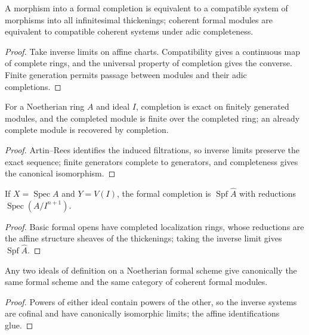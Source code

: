 \begin{proposition}
\label{prop:II-9-2}
A morphism into a formal completion is equivalent to a compatible system of morphisms into all
infinitesimal thickenings; coherent formal modules are equivalent to compatible coherent systems
under adic completeness.
\end{proposition}
\begin{proof}
Take inverse limits on affine charts. Compatibility gives a continuous map of complete rings, and
the universal property of completion gives the converse. Finite generation permits passage between
modules and their adic completions.
\end{proof}


\begin{theorem}
\label{thm:II-9-3A}
For a Noetherian ring $A$ and ideal $I$, completion is exact on finitely generated modules, and the
completed module is finite over the completed ring; an already complete module is recovered by completion.
\end{theorem}
\begin{proof}
Artin--Rees identifies the induced filtrations, so inverse limits preserve the exact sequence; finite
generators complete to generators, and completeness gives the canonical isomorphism.
\end{proof}

\begin{proposition}
\label{prop:II-9-4}
If $X=\operatorname{Spec}A$ and $Y=V(I)$, the formal completion is
$\operatorname{Spf}\widehat A$ with reductions $\operatorname{Spec}(A/I^{n+1})$.
\end{proposition}
\begin{proof}
Basic formal opens have completed localization rings, whose reductions are the affine structure sheaves
of the thickenings; taking the inverse limit gives $\operatorname{Spf}\widehat A$.
\end{proof}

\begin{proposition}
\label{prop:II-9-5}
Any two ideals of definition on a Noetherian formal scheme give canonically the same formal scheme and
the same category of coherent formal modules.
\end{proposition}
\begin{proof}
Powers of either ideal contain powers of the other, so the inverse systems are cofinal and have
canonically isomorphic limits; the affine identifications glue.
\end{proof}

